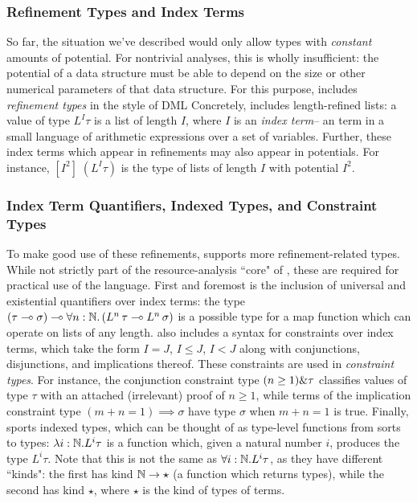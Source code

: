 \subsubsection{Refinement Types and Index Terms}
\label{sec:lambdaamor-overview-refty}
So far, the situation we've described would only allow types with \textit{constant} amounts of potential. For nontrivial analyses, this is wholly insufficient: the potential of a data structure must be able to depend on the size or other numerical parameters of that data structure. For this purpose, \lambdaamor includes \textit{refinement types} in the style of DML Concretely, \lambdaamor includes length-refined lists: a value of type $L^I \tau$ is a list of length $I$, where $I$ is an \textit{index term}-- an term in a small language of arithmetic expressions over a set of variables. Further, these index terms which appear in refinements may also appear in potentials. For instance, $\left[I^2\right] \; (L^I \tau)$ is the type of lists of length $I$ with potential $I^2$. 

\subsubsection{Index Term Quantifiers, Indexed Types, and Constraint Types}
To make good use of these refinements, \lambdaamor supports more refinement-related types. While not strictly part of the resource-analysis ``core" of \lambdaamor, these are required for practical use of the language. First and foremost is the inclusion of universal and existential quantifiers over index terms: the type $(\tau \multimap \sigma) \multimap \forall n : \mathbb{N}. \left(L^n \,\tau \multimap L^{n} \, \sigma\right)$ is a possible type for a map function which can operate on lists of any length. \lambdaamor also includes a syntax for constraints over index terms, which take the form $I = J$, $I \leq J$, $I < J$ along with conjunctions, disjunctions, and implications thereof. These constraints are used in \textit{constraint types}. For instance, the conjunction constraint type $(n \geq 1) \& \tau$ classifies values of type $\tau$ with an attached (irrelevant) proof of $n \geq 1$, while terms of the implication constraint type $(m + n = 1) \implies \sigma$ have type $\sigma$ when $m + n = 1$ is true. Finally, \lambdaamor sports indexed types, which can be thought of as type-level functions from sorts to types: $\lambda i : \mathbb{N}. L^i \tau$ is a function which, given a natural number $i$, produces the type $L^i \tau$. Note that this is not the same as $\forall i: \mathbb{N}. L^i \tau$, as they have different ``kinds": the first has kind $\mathbb{N} \to \star$ (a function which returns types), while the second has kind $\star$, where $\star$ is the kind of types of terms.

